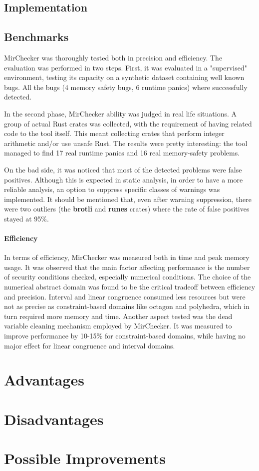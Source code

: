 \documentclass{article}
\begin{document}
\subsection*{Implementation}
\subsection*{Benchmarks}
MirChecker  was thoroughly tested both in precision and efficiency. The evaluation was performed
in two steps. First, it was evaluated in a "supervised" environment, testing its capacity on a synthetic dataset 
containing well known bugs. All the bugs (4 memory safety bugs, 6 runtime panics) where successfully detected. 

In the second phase, 
MirChecker ability was judged in real life situations. A group of actual Rust crates was collected, with the requirement of having related code to 
the tool itself. This meant collecting crates that perform integer arithmetic and/or use unsafe Rust. The results were pretty interesting: the tool managed to find
17 real runtime panics and 16 real memory-safety problems. 

On the bad side, it was noticed that most of the detected problems 
were false positives. Although this is expected in static analysis, in order to have
a more reliable analysis, an option to suppress specific classes of warnings was implemented. It should be mentioned that, even after warning suppression, there were two outliers (the \textbf{brotli} and \textbf{runes} crates) where the rate 
of false positives stayed at 95\%.

\paragraph*{Efficiency} In terms of efficiency, MirChecker was measured both in time and peak memory usage. It was observed that 
the main factor affecting performance is the number of security conditions checked, especially numerical conditions. The choice of the numerical abstract domain 
was found to be the critical tradeoff between efficiency and precision. Interval and linear congruence  consumed less resources but were not as precise as constraint-based domains 
like octagon and polyhedra, which in turn required more memory and time. Another aspect tested was  the dead variable cleaning mechanism 
employed by MirChecker. It was measured to improve performance by 
 10-15\% for constraint-based domains,  while having no major effect for linear congruence and interval domains. \section*{Advantages}

\section*{Disadvantages}

\section*{Possible Improvements}



\end{document}
